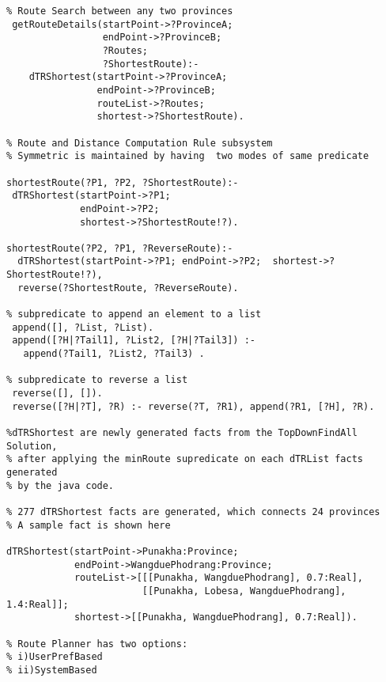 \begin{verbatim}
% Route Search between any two provinces
 getRouteDetails(startPoint->?ProvinceA;  
                 endPoint->?ProvinceB;  
                 ?Routes;  
                 ?ShortestRoute):- 
    dTRShortest(startPoint->?ProvinceA; 
                endPoint->?ProvinceB; 
                routeList->?Routes; 
                shortest->?ShortestRoute).
                
% Route and Distance Computation Rule subsystem                                              
% Symmetric is maintained by having  two modes of same predicate

shortestRoute(?P1, ?P2, ?ShortestRoute):-
 dTRShortest(startPoint->?P1; 
             endPoint->?P2;  
             shortest->?ShortestRoute!?).

shortestRoute(?P2, ?P1, ?ReverseRoute):-
  dTRShortest(startPoint->?P1; endPoint->?P2;  shortest->?ShortestRoute!?),
  reverse(?ShortestRoute, ?ReverseRoute).
                             					 
% subpredicate to append an element to a list
 append([], ?List, ?List).                    
 append([?H|?Tail1], ?List2, [?H|?Tail3]) :-     
   append(?Tail1, ?List2, ?Tail3) . 

% subpredicate to reverse a list		 
 reverse([], []).             
 reverse([?H|?T], ?R) :- reverse(?T, ?R1), append(?R1, [?H], ?R).
            
%dTRShortest are newly generated facts from the TopDownFindAll Solution, 
% after applying the minRoute supredicate on each dTRList facts generated
% by the java code.

% 277 dTRShortest facts are generated, which connects 24 provinces
% A sample fact is shown here
                             
dTRShortest(startPoint->Punakha:Province; 
            endPoint->WangduePhodrang:Province; 
            routeList->[[[Punakha, WangduePhodrang], 0.7:Real],
                        [[Punakha, Lobesa, WangduePhodrang], 1.4:Real]]; 
            shortest->[[Punakha, WangduePhodrang], 0.7:Real]).
            
% Route Planner has two options:
% i)UserPrefBased
% ii)SystemBased


\end{verbatim}
